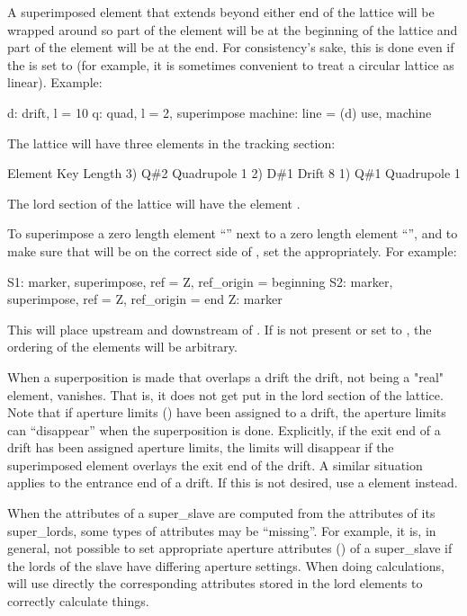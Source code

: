 A superimposed element that extends beyond either end of the lattice
will be wrapped around so part of the element will be at the beginning
of the lattice and part of the element will be at the end. For
consistency's sake, this is done even if the  is set to
 (for example, it is sometimes convenient to treat a circular
lattice as linear). Example:
\begin{example}
  d: drift, l = 10
  q: quad, l = 2, superimpose
  machine: line = (d)
  use, machine
\end{example}
The lattice will have three elements in the tracking section:
\begin{example}
        Element   Key           Length
  3)    Q{\#}2       Quadrupole    1
  2)    D{\#}1       Drift         8
  1)    Q{\#}1       Quadrupole    1
\end{example}
The lord section of the lattice will have the element . 

To superimpose a zero length element ``'' next to a zero length
element ``'', and to make sure that  will be on the
correct side of , set the  appropriately.
For example:
\begin{example}
  S1: marker, superimpose, ref = Z, ref_origin = beginning
  S2: marker, superimpose, ref = Z, ref_origin = end
  Z: marker
\end{example}
This will place  upstream and  downstream of .  If
 is not present or set to , the ordering of the
elements will be arbitrary.

When a superposition is made that overlaps a drift the drift, not
being a "real" element, vanishes. That is, it does not get put in the
lord section of the lattice.  Note that if aperture limits
() have been assigned to a drift, the aperture limits
can ``disappear'' when the superposition is done. Explicitly, if the
exit end of a drift has been assigned aperture limits, the limits will
disappear if the superimposed element overlays the exit end of the
drift. A similar situation applies to the entrance end of a drift. If
this is not desired, use a  element instead.

When the attributes of a super_slave are computed from the attributes
of its super_lords, some types of attributes may be ``missing''. For
example, it is, in general, not possible to set appropriate aperture
attributes () of a super_slave if the lords of the slave
have differing aperture settings. When doing calculations, \bmad will
use directly the corresponding attributes stored in the lord elements to
correctly calculate things.

